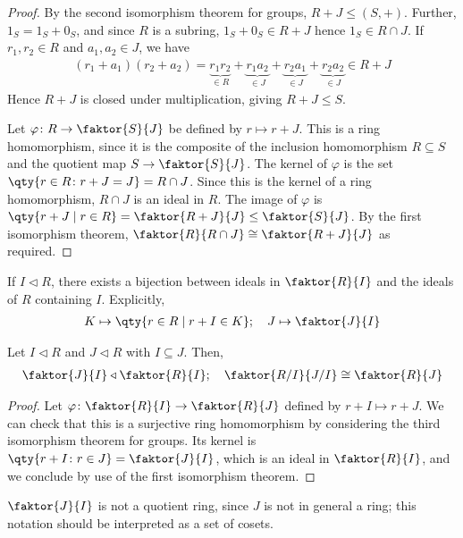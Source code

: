 \begin{proof}
	By the second isomorphism theorem for groups, $R+J \leq (S, +)$.
	Further, $1_S = 1_S + 0_S$, and since $R$ is a subring, $1_S + 0_S \in R + J$ hence $1_S \in R \cap J$.
	If $r_1, r_2 \in R$ and $a_1, a_2 \in J$, we have
	\begin{align*}
		(r_1 + a_1)(r_2 + a_2) = \underbrace{r_1 r_2}_{\in R} + \underbrace{r_1 a_2}_{\in J} + \underbrace{r_2 a_1}_{\in J} + \underbrace{r_2 a_2}_{\in J} \in R + J
	\end{align*}
	Hence $R+J$ is closed under multiplication, giving $R+J \leq S$.

	Let $\varphi \colon R \to \faktor{S}{J}$ be defined by $r \mapsto r + J$.
	This is a ring homomorphism, since it is the composite of the inclusion homomorphism $R \subseteq S$ and the quotient map $S \to \faktor{S}{J}$.
	The kernel of $\varphi$ is the set $\qty{r \in R \colon r+J = J} = R \cap J$.
	Since this is the kernel of a ring homomorphism, $R \cap J$ is an ideal in $R$.
	The image of $\varphi$ is $\qty{r+J \mid r \in R} = \faktor{R+J}{J} \leq \faktor{S}{J}$.
	By the first isomorphism theorem, $\faktor{R}{R \cap J} \cong \faktor{R+J}{J}$ as required.
\end{proof}
\begin{remark}
	If $I \triangleleft R$, there exists a bijection between ideals in $\faktor{R}{I}$ and the ideals of $R$ containing $I$.
	Explicitly,
	\begin{align*}
		K \mapsto \qty{r \in R \mid r + I \in K};\quad J \mapsto \faktor{J}{I}
	\end{align*}
\end{remark}
\begin{theorem}
	Let $I \triangleleft R$ and $J \triangleleft R$ with $I \subseteq J$.
	Then,
	\begin{align*}
		\faktor{J}{I} \triangleleft \faktor{R}{I};\quad \faktor{R/I}{J/I} \cong \faktor{R}{J}
	\end{align*}
\end{theorem}
\begin{proof}
	Let $\varphi \colon \faktor{R}{I} \to \faktor{R}{J}$ defined by $r+I \mapsto r+J$.
	We can check that this is a surjective ring homomorphism by considering the third isomorphism theorem for groups.
	Its kernel is $\qty{r + I \colon r \in J} = \faktor{J}{I}$, which is an ideal in $\faktor{R}{I}$, and we conclude by use of the first isomorphism theorem.
\end{proof}
\begin{remark}
	$\faktor{J}{I}$ is not a quotient ring, since $J$ is not in general a ring; this notation should be interpreted as a set of cosets.
\end{remark}
